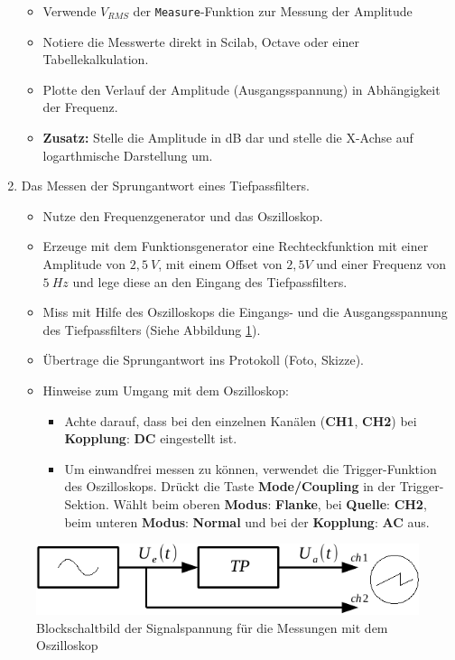 \begin{enumerate}
\begin{itemize}
			\item Verwende \texttt{$V_{RMS}$} der \texttt{Measure}-Funktion zur Messung der Amplitude
			\item Notiere die Messwerte direkt in Scilab, Octave oder einer Tabellekalkulation.
			\item Plotte den Verlauf der Amplitude (Ausgangsspannung) in Abhängigkeit der Frequenz.
			\item \textbf{Zusatz:} Stelle die Amplitude in dB dar und stelle die X-Achse auf logarthmische Darstellung um.
			\end{itemize}
	\item Das Messen der Sprungantwort eines Tiefpassfilters.
		\begin{itemize}
			\item Nutze den Frequenzgenerator und das Oszilloskop.
			\item Erzeuge mit dem Funktionsgenerator eine Rechteckfunktion mit einer Amplitude von $2,5~V$, mit einem Offset von $2,5 V$ und einer Frequenz von $5~Hz$ und lege diese an den Eingang des Tiefpassfilters.
			\item Miss mit Hilfe des Oszilloskops die Eingangs- und die Ausgangsspannung des Tiefpassfilters (Siehe Abbildung \ref{block2}).
			\item Übertrage die Sprungantwort ins Protokoll (Foto, Skizze).
			\item Hinweise zum Umgang mit dem Oszilloskop:
				\begin{itemize}
					\item Achte darauf, dass bei den einzelnen Kanälen (\textbf{CH1}, \textbf{CH2}) bei \textbf{Kopplung}: \textbf{DC} eingestellt ist.
					\item Um einwandfrei messen zu können, verwendet die Trigger-Funktion
            des Oszilloskops. Drückt die Taste \textbf{Mode/Coupling} in der
            Trigger-Sektion. Wählt beim oberen \textbf{Modus}: \textbf{Flanke}, bei \textbf{Quelle}: \textbf{CH2}, beim unteren \textbf{Modus}: \textbf{Normal} und bei der \textbf{Kopplung}: \textbf{AC} aus.
					\end{itemize}
			\end{itemize}
 	\end{enumerate} 


\bigskip

\begin{figure}[H]
	\centering
	\includegraphics[scale=1]{Messtechnik/Bilder/Block_Messung_oszi.pdf}
	\caption{Blockschaltbild der Signalspannung für die Messungen mit dem Oszilloskop}
	\label{block2}
	\end{figure}
